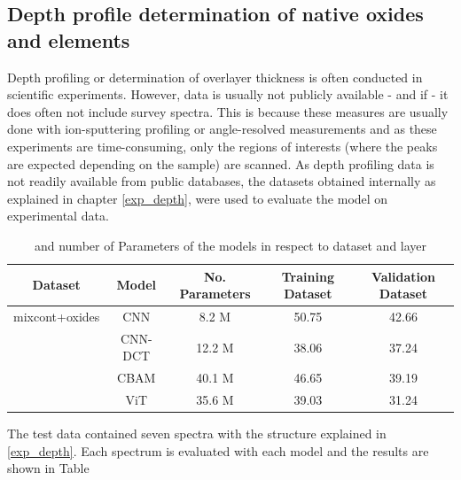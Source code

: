 \subsection{Depth profile determination of native oxides and elements}

Depth profiling or determination of overlayer thickness is often conducted in scientific experiments. However, data is usually not publicly available - and if - it does often not include survey spectra. This is because these measures are usually done with ion-sputtering profiling or angle-resolved measurements and as these experiments are time-consuming, only the regions of interests (where the peaks are expected depending on the sample) are scanned.
As depth profiling data is not readily available from public databases, the datasets obtained internally as explained in chapter \ref{exp_depth}, were used to evaluate the model on experimental data.

\begin{table}[H]
    \centering
    \begin{tabular}{c|c|c|c|c}
        Dataset & Model   & No. Parameters & Training Dataset    & Validation Dataset    \\
        \hline
 mixcont+oxides& CNN     &   8.2 M       &      50.75      &          42.66         \\
               & CNN-DCT &   12.2 M       &     38.06           &      37.24           \\
               & CBAM    &   40.1 M       &    46.65             &      39.19            \\
               & ViT     &    35.6 M     &      39.03            &       31.24           \\

    \end{tabular}
    \caption{ and number of Parameters of the models in respect to dataset and layer}
    \label{tab:acc_depth}
\end{table}

The test data contained seven spectra with the structure explained in \ref{exp_depth}. Each spectrum is evaluated with each model and the results are shown in Table 


